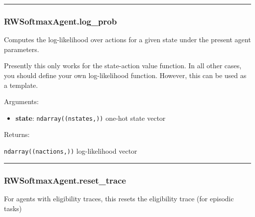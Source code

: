 \begin{center}\rule{0.5\linewidth}{\linethickness}\end{center}

\hypertarget{rwsoftmaxagent.log_prob}{%
\subsubsection{RWSoftmaxAgent.log\_prob}\label{rwsoftmaxagent.log_prob}}

\begin{Shaded}
\begin{Highlighting}[]
\end{Highlighting}
\end{Shaded}

Computes the log-likelihood over actions for a given state under the
present agent parameters.

Presently this only works for the state-action value function. In all
other cases, you should define your own log-likelihood function.
However, this can be used as a template.

Arguments:

\begin{itemize}
\tightlist
\item
  \textbf{state}: \texttt{ndarray((nstates,))} one-hot state vector
\end{itemize}

Returns:

\texttt{ndarray((nactions,))} log-likelihood vector

\begin{center}\rule{0.5\linewidth}{\linethickness}\end{center}

\hypertarget{rwsoftmaxagent.reset_trace}{%
\subsubsection{RWSoftmaxAgent.reset\_trace}\label{rwsoftmaxagent.reset_trace}}

\begin{Shaded}
\begin{Highlighting}[]
\OperatorTok{=}\NormalTok{)}
\end{Highlighting}
\end{Shaded}

For agents with eligibility traces, this resets the eligibility trace
(for episodic tasks)

